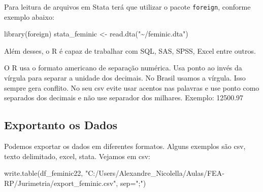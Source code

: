 \documentclass[
  letterpaper,
  DIV=11,
  numbers=noendperiod]{scrreprt}
\newenvironment{Shaded}{\begin{snugshade}}{\end{snugshade}}
\newcommand{\AttributeTok}[1]{\textcolor[rgb]{0.40,0.45,0.13}{#1}}
\newcommand{\FunctionTok}[1]{\textcolor[rgb]{0.28,0.35,0.67}{#1}}
\newcommand{\NormalTok}[1]{\textcolor[rgb]{0.00,0.23,0.31}{#1}}
\newcommand{\OtherTok}[1]{\textcolor[rgb]{0.00,0.23,0.31}{#1}}
\newcommand{\StringTok}[1]{\textcolor[rgb]{0.13,0.47,0.30}{#1}}
\begin{document}
Para leitura de arquivos em Stata terá que utilizar o pacote
\texttt{foreign}, conforme exemplo abaixo:

\begin{Shaded}
\begin{Highlighting}[]
\FunctionTok{library}\NormalTok{(foreign)}
\NormalTok{stata\_feminic }\OtherTok{\textless{}{-}} \FunctionTok{read.dta}\NormalTok{(}\StringTok{"\textasciitilde{}/feminic.dta"}\NormalTok{)}
\end{Highlighting}
\end{Shaded}

Além desses, o R é capaz de trabalhar com SQL, SAS, SPSS, Excel entre
outros.

\begin{tcolorbox}[enhanced jigsaw, titlerule=0mm, colback=white, coltitle=black, opacityback=0, breakable, colbacktitle=quarto-callout-warning-color!10!white, toprule=.15mm, colframe=quarto-callout-warning-color-frame, toptitle=1mm, bottomtitle=1mm, opacitybacktitle=0.6, left=2mm, arc=.35mm, rightrule=.15mm, bottomrule=.15mm, leftrule=.75mm, title=\textcolor{quarto-callout-warning-color}{\faExclamationTriangle}\hspace{0.5em}{Cuidado com o Ponto}]

O R usa o formato americano de separação numérica. Usa ponto ao invés da
vírgula para separar a unidade dos decimais. No Brasil usamos a vírgula.
Isso sempre gera conflito. No seu csv evite usar acentos nas palavras e
use ponto como separados dos decimais e não use separador dos milhares.
Exemplo: 12500.97

\end{tcolorbox}

\subsection{Exportanto os Dados}\label{exportanto-os-dados}

Podemos exportar os dados em diferentes formatos. Alguns exemplos são
csv, texto delimitado, excel, stata. Vejamos em csv:

\begin{Shaded}
\begin{Highlighting}[]
\FunctionTok{write.table}\NormalTok{(df\_feminic22, }\StringTok{"C:/Users/Alexandre\_Nicolella/Aulas/FEA{-}RP/Jurimetria/export\_feminic.csv"}\NormalTok{, }\AttributeTok{sep=}\StringTok{";"}\NormalTok{)}
\end{Highlighting}
\end{Shaded}
\end{document}
